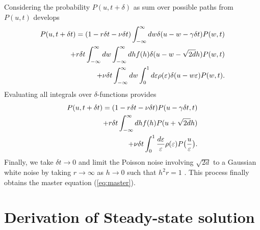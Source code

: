 Considering the probability $P(u,t+\delta)$ as sum over possible paths from $P(u,t)$ develops 
\begin{align} P(u,t+\delta t) =
	(1- r \delta t - \nu \delta t)\int_{-\infty}^\infty dw  \delta(u-w-\gamma \delta t) P(w,t)\\ 
	+  r \delta t \int_{-\infty}^\infty dw \int_{-\infty}^\infty dh f(h) \delta (u - w - \sqrt{2 d}h) P(w,t) \\ 
	+ \nu \delta t \int_{-\infty}^\infty dw \int_0^1 d\varepsilon \rho(\varepsilon)  \delta(u-w\varepsilon) P(w,t).
\end{align}
Evaluating all integrals over $\delta$-functions provides 
\begin{align} P(u,t+\delta t) = (1-r \delta t - \nu \delta t)P(u-\gamma \delta t, t) \\+ r \delta t\int_{-\infty}^\infty dh f(h) P(u+\sqrt{2d}h) \\+ \nu \delta t \int_0^1 \frac{d\varepsilon}{\varepsilon} \rho(\varepsilon) P\big(\frac{u}{\varepsilon}\big).\end{align}
Finally, we take $\delta t \rightarrow 0$ and limit the Poisson noise involving $\sqrt{2d}$ to a Gaussian white noise by taking $r \rightarrow \infty$ as $h \rightarrow 0$ such that $h^2 r = 1$ \cite{VanKampen1983}. This process finally obtains the master equation (\ref{eq:master}).
\section{Derivation of Steady-state solution}

